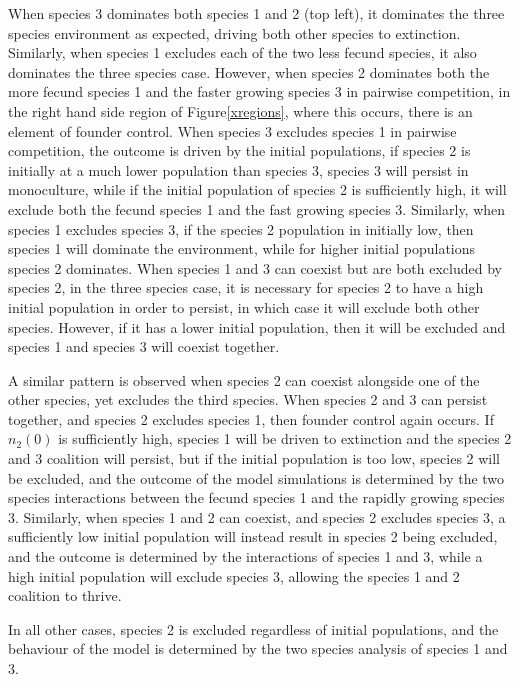 When species 3 dominates both species 1 and 2 (top left), it dominates the three species environment as expected, driving both other species to extinction. Similarly, when species 1 excludes each of the two less fecund species, it also dominates the three species case. However, when species 2 dominates both the more fecund species 1 and the faster growing species 3 in pairwise competition, in the right hand side region of Figure\ref{xregions}, where this occurs, there is an element of founder control. When species 3 excludes species 1 in pairwise competition, the outcome is driven by the initial populations, if species 2 is initially at a much lower population than species 3, species 3 will persist in monoculture, while if the initial population of species 2 is sufficiently high, it will exclude both the fecund species 1 and the fast growing species 3. Similarly, when species 1 excludes species 3, if the species 2 population in initially low, then species 1 will dominate the environment, while for higher initial populations species 2 dominates. When species 1 and 3 can coexist but are both excluded by species 2, in the three species case, it is necessary for species 2 to have a high initial population in order to persist, in which case it will exclude both other species. However, if it has a lower initial population, then it will be excluded and species 1 and species 3 will coexist together.

A similar pattern is observed when species 2 can coexist alongside one of the other species, yet excludes the third species. When species 2 and 3 can persist together, and species 2 excludes species 1, then founder control again occurs. If $n_2(0)$ is sufficiently high, species 1 will be driven to extinction and the species 2 and 3 coalition will persist, but if the initial population is too low, species 2 will be excluded, and the outcome of the model simulations is determined by the two species interactions between the fecund species 1 and the rapidly growing species 3. Similarly, when species 1 and 2 can coexist, and species 2 excludes species 3, a sufficiently low initial population will instead result in species 2 being excluded, and the outcome is determined by the interactions of species 1 and 3, while a high initial population will exclude species 3, allowing the species 1 and 2 coalition to thrive.

In all other cases, species 2 is excluded regardless of initial populations, and the behaviour of the model is determined by the two species analysis of species 1 and 3.


